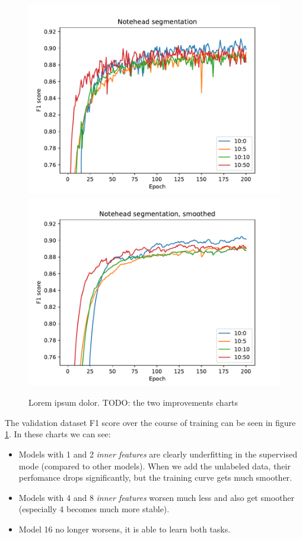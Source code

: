 \begin{figure}[p]
    \centering
    \includegraphics[width=140mm]{../../figures/01-exploration-noteheads/noteheads-dropout.pdf}
    \includegraphics[width=140mm]{../../figures/01-exploration-noteheads/noteheads-dropout-smooth.pdf}
    \caption{Lorem ipsum dolor. TODO: the two improvements charts}
    \label{fig:CvcImprovements}
\end{figure}

The validation dataset F1 score over the course of training can be seen in figure \ref{fig:CvcImprovements}. In these charts we can see:

\begin{itemize}
    \item Models with 1 and 2 \emph{inner features} are clearly underfitting in the supervised mode (compared to other models). When we add the unlabeled data, their perfomance drops significantly, but the training curve gets much smoother.
    \item Models with 4 and 8 \emph{inner features} worsen much less and also get smoother (especially 4 becomes much more stable).
    \item Model 16 no longer worsens, it is able to learn both tasks.
\end{itemize}

